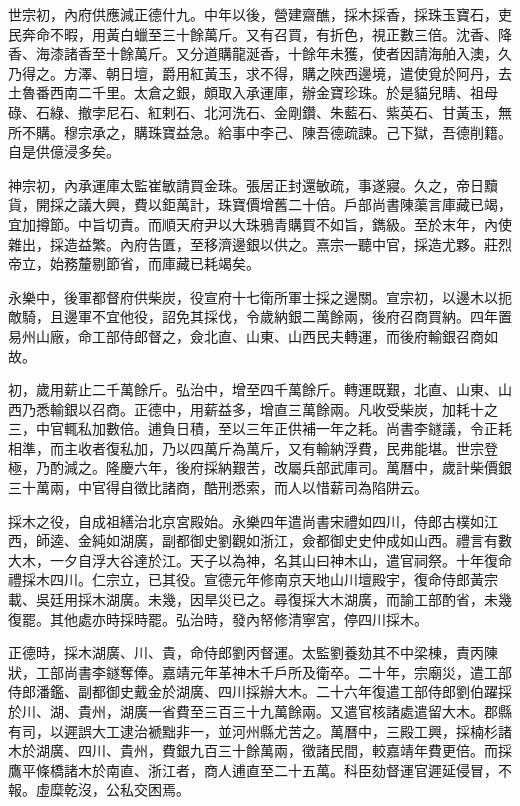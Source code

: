 世宗初，內府供應減正德什九。中年以後，營建齋醮，採木採香，採珠玉寶石，吏民奔命不暇，用黃白蠟至三十餘萬斤。又有召買，有折色，視正數三倍。沈香、降香、海漆諸香至十餘萬斤。又分道購龍涎香，十餘年未獲，使者因請海舶入澳，久乃得之。方澤、朝日壇，爵用紅黃玉，求不得，購之陜西邊境，遣使覓於阿丹，去土魯番西南二千里。太倉之銀，頗取入承運庫，辦金寶珍珠。於是貓兒睛、祖母碌、石綠、撤孛尼石、紅剌石、北河洗石、金剛鑽、朱藍石、紫英石、甘黃玉，無所不購。穆宗承之，購珠寶益急。給事中李己、陳吾德疏諫。己下獄，吾德削籍。自是供億浸多矣。

神宗初，內承運庫太監崔敏請買金珠。張居正封還敏疏，事遂寢。久之，帝日黷貨，開採之議大興，費以鉅萬計，珠寶價增舊二十倍。戶部尚書陳蕖言庫藏已竭，宜加撙節。中旨切責。而順天府尹以大珠鴉青購買不如旨，鐫級。至於末年，內使雜出，採造益繁。內府告匱，至移濟邊銀以供之。熹宗一聽中官，採造尤夥。莊烈帝立，始務釐剔節省，而庫藏已耗竭矣。

永樂中，後軍都督府供柴炭，役宣府十七衛所軍士採之邊關。宣宗初，以邊木以扼敵騎，且邊軍不宜他役，詔免其採伐，令歲納銀二萬餘兩，後府召商買納。四年置易州山廠，命工部侍郎督之，僉北直、山東、山西民夫轉運，而後府輸銀召商如故。

初，歲用薪止二千萬餘斤。弘治中，增至四千萬餘斤。轉運既艱，北直、山東、山西乃悉輸銀以召商。正德中，用薪益多，增直三萬餘兩。凡收受柴炭，加耗十之三，中官輒私加數倍。逋負日積，至以三年正供補一年之耗。尚書李鐩議，令正耗相準，而主收者復私加，乃以四萬斤為萬斤，又有輸納浮費，民弗能堪。世宗登極，乃酌減之。隆慶六年，後府採納艱苦，改屬兵部武庫司。萬曆中，歲計柴價銀三十萬兩，中官得自徵比諸商，酷刑悉索，而人以惜薪司為陷阱云。

採木之役，自成祖繕治北京宮殿始。永樂四年遣尚書宋禮如四川，侍郎古樸如江西，師逵、金純如湖廣，副都御史劉觀如浙江，僉都御史史仲成如山西。禮言有數大木，一夕自浮大谷達於江。天子以為神，名其山曰神木山，遣官祠祭。十年復命禮採木四川。仁宗立，已其役。宣德元年修南京天地山川壇殿宇，復命侍郎黃宗載、吳廷用採木湖廣。未幾，因旱災已之。尋復採大木湖廣，而諭工部酌省，未幾復罷。其他處亦時採時罷。弘治時，發內帑修清寧宮，停四川採木。

正德時，採木湖廣、川、貴，命侍郎劉丙督運。太監劉養劾其不中梁棟，責丙陳狀，工部尚書李鐩奪俸。嘉靖元年革神木千戶所及衛卒。二十年，宗廟災，遣工部侍郎潘鑑、副都御史戴金於湖廣、四川採辦大木。二十六年復遣工部侍郎劉伯躍採於川、湖、貴州，湖廣一省費至三百三十九萬餘兩。又遣官核諸處遣留大木。郡縣有司，以遲誤大工逮治褫黜非一，並河州縣尤苦之。萬曆中，三殿工興，採楠杉諸木於湖廣、四川、貴州，費銀九百三十餘萬兩，徵諸民間，較嘉靖年費更倍。而採鷹平條橋諸木於南直、浙江者，商人逋直至二十五萬。科臣劾督運官遲延侵冒，不報。虛糜乾沒，公私交困焉。

